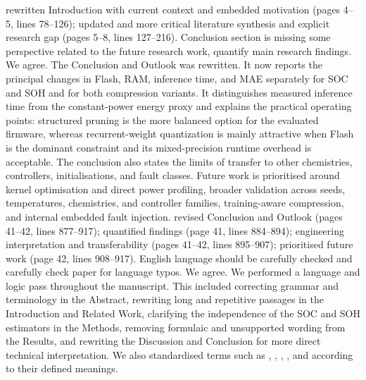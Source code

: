 {} rewritten Introduction with current context and embedded motivation (pages 4--5, lines 78--126); updated and more critical literature synthesis and explicit research gap (pages 5--8, lines 127--216).\markdownRendererInterblockSeparator
{}
\markdownRendererSectionEnd \markdownRendererSectionBegin
{}\markdownRendererInterblockSeparator
{}\markdownRendererBlockQuoteBegin
Conclusion section is missing some perspective related to the future research work, quantify main research findings.\markdownRendererBlockQuoteEnd \markdownRendererInterblockSeparator
{} We agree. The Conclusion and Outlook was rewritten. It now reports the principal changes in Flash, RAM, inference time, and MAE separately for SOC and SOH and for both compression variants. It distinguishes measured inference time from the constant-power energy proxy and explains the practical operating points: structured pruning is the more balanced option for the evaluated firmware, whereas recurrent-weight quantization is mainly attractive when Flash is the dominant constraint and its mixed-precision runtime overhead is acceptable. The conclusion also states the limits of transfer to other chemistries, controllers, initialisations, and fault classes. Future work is prioritised around kernel optimisation and direct power profiling, broader validation across seeds, temperatures, chemistries, and controller families, training-aware compression, and internal embedded fault injection.\markdownRendererParagraphSeparator
{} revised Conclusion and Outlook (pages 41--42, lines 877--917); quantified findings (page 41, lines 884--894); engineering interpretation and transferability (pages 41--42, lines 895--907); prioritised future work (page 42, lines 908--917).\markdownRendererInterblockSeparator
{}
\markdownRendererSectionEnd \markdownRendererSectionBegin
{}\markdownRendererInterblockSeparator
{}\markdownRendererBlockQuoteBegin
English language should be carefully checked and carefully check paper for language typos.\markdownRendererBlockQuoteEnd \markdownRendererInterblockSeparator
{} We agree. We performed a language and logic pass throughout the manuscript. This included correcting grammar and terminology in the Abstract, rewriting long and repetitive passages in the Introduction and Related Work, clarifying the independence of the SOC and SOH estimators in the Methods, removing formulaic and unsupported wording from the Results, and rewriting the Discussion and Conclusion for more direct technical interpretation. We also standardised terms such as , , , , and  according to their defined meanings.\markdownRendererParagraphSeparator
